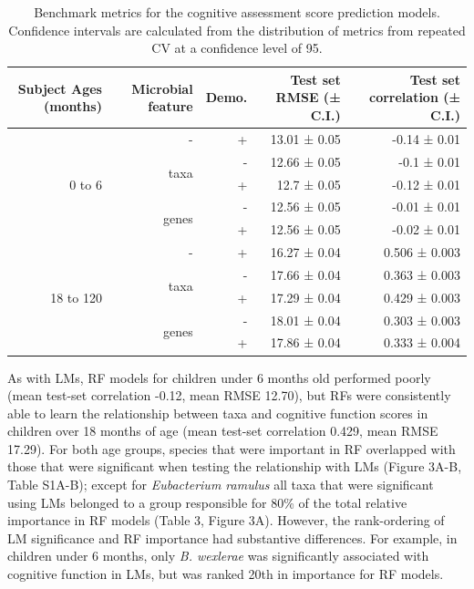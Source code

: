 \documentclass{article}
\begin{document}
\begin{table}[!h]
    \begin{center}
    \begin{tabular}{|r|r|r|r|r|}
      \hline\hline
      \textbf{Subject Ages (months)} & \textbf{Microbial feature} & \textbf{Demo.} & \textbf{Test set RMSE (± C.I.)} & \textbf{Test set correlation (± C.I.)} \\\hline
      \multirow{5}{*}{0 to 6} & - & + & 13.01 ± 0.05 & -0.14 ± 0.01 \\ \cline{2-5}
            & \multirow{2}{*}{taxa} & - & 12.66 ± 0.05 & -0.1 ± 0.01 \\ \cline{3-5}
            &       & + & 12.7 ± 0.05 & -0.12 ± 0.01 \\ \cline{2-5}
            & \multirow{2}{*}{genes} & - & 12.56 ± 0.05 & -0.01 ± 0.01 \\ \cline{3-5}
            &       & + & 12.56 ± 0.05 & -0.02 ± 0.01 \\ \cline{1-5}
      \multirow{5}{*}{18 to 120} & - & + & 16.27 ± 0.04 & 0.506 ± 0.003 \\ \cline{2-5}
            & \multirow{2}{*}{taxa} & - & 17.66 ± 0.04 & 0.363 ± 0.003 \\ \cline{3-5}
            &       & + & 17.29 ± 0.04 & 0.429 ± 0.003 \\ \cline{2-5}
            & \multirow{2}{*}{genes} & - & 18.01 ± 0.04 & 0.303 ± 0.003 \\ \cline{3-5}
            &       & + & 17.86 ± 0.04 & 0.333 ± 0.004 \\\hline\hline
    \end{tabular}
    \caption{\label{tab:rfbench}Benchmark metrics for the cognitive assessment score
    prediction models. Confidence intervals are calculated from the
    distribution of metrics from repeated CV at a confidence level of 95.}
    \end{center}
\end{table}

As with LMs, RF models for children under 6 months old
performed poorly (mean test-set correlation -0.12, mean RMSE 12.70),
but RFs were consistently able to learn the relationship between taxa
and cognitive function scores in children over 18 months of age (mean
test-set correlation 0.429, mean RMSE 17.29). For both age groups,
species that were important in RF overlapped with those that were
significant when testing the relationship with LMs (Figure
3A-B, Table S1A-B); except for \emph{Eubacterium ramulus}
all taxa that were significant using LMs belonged to a group
responsible for 80\% of the total relative importance in RF models
(Table 3, Figure 3A).
However, the rank-ordering of LM significance and RF importance
had substantive differences. For example, in children under 6 months,
only \emph{B. wexlerae} was significantly associated with cognitive function in LMs, but
was ranked 20th in importance for RF models. 
\end{document}
